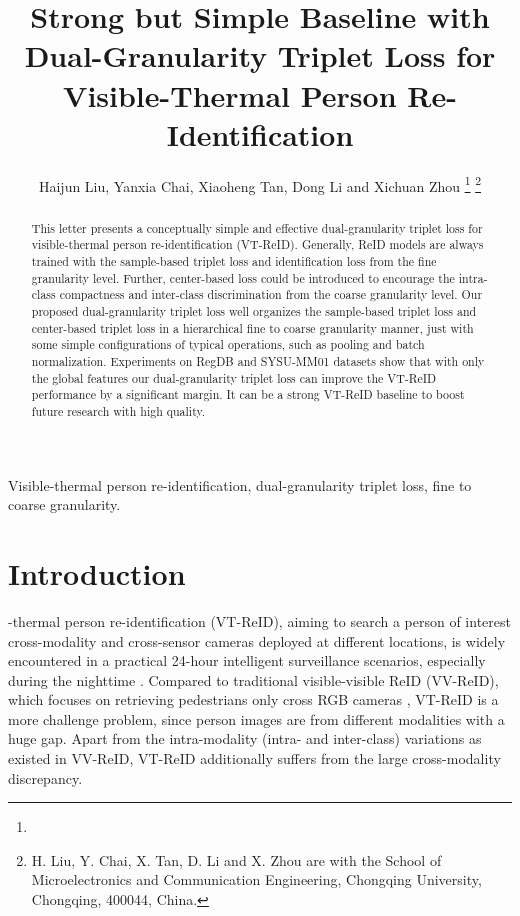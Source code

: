 \documentclass[journal]{IEEEtran}
\begin{document}
\title{Strong but Simple Baseline with Dual-Granularity Triplet Loss for Visible-Thermal Person Re-Identification}

\author{Haijun Liu, Yanxia Chai, Xiaoheng Tan, Dong Li and Xichuan Zhou
\thanks{}
\thanks{H. Liu, Y. Chai, X. Tan, D. Li and X. Zhou are with the School of Microelectronics and Communication Engineering, Chongqing University, Chongqing, 400044, China.}
}



\maketitle

\begin{abstract}
This letter presents a conceptually simple and effective dual-granularity triplet loss for visible-thermal person re-identification (VT-ReID). Generally, ReID models are always trained with the sample-based triplet loss and identification loss from the fine granularity level. Further, center-based loss could be introduced to encourage the intra-class compactness and inter-class discrimination from the coarse granularity level. Our proposed dual-granularity triplet loss well organizes the sample-based triplet loss and center-based triplet loss in a hierarchical fine to coarse granularity manner, just with some simple configurations of typical operations, such as pooling and batch normalization.
Experiments on RegDB and SYSU-MM01 datasets show that with only the global features our dual-granularity triplet loss can improve the VT-ReID performance by a significant margin. It can be a strong VT-ReID baseline to boost future research with high quality.

\end{abstract}

\begin{IEEEkeywords}
 Visible-thermal person re-identification, dual-granularity triplet loss, fine to coarse granularity.
\end{IEEEkeywords}

\section{Introduction}
\label{sec:intro}

-thermal person re-identification (VT-ReID), aiming to search a person of interest cross-modality and cross-sensor cameras deployed at different locations, is widely encountered in a practical 24-hour intelligent surveillance scenarios, especially during the nighttime \cite{tifs19vtreid}. Compared to traditional visible-visible ReID (VV-ReID), which focuses on retrieving pedestrians only cross RGB cameras \cite{Ye2020DeepLF,Liu2019Gallery}, VT-ReID is a more challenge problem, since person images are from different modalities with a huge gap. Apart from the intra-modality (intra- and inter-class) variations as existed in VV-ReID, VT-ReID additionally suffers from the large cross-modality discrepancy.
\end{document}
